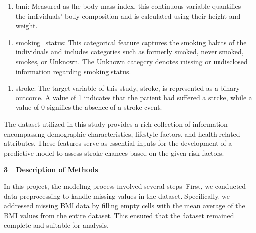 \documentclass[letterpaper]{article}
\newcounter{saveenum}
\newcommand\liststyleWWNumi{%
\renewcommand\theenumi{\arabic{enumi}}
\renewcommand\theenumii{\arabic{enumii}}
\renewcommand\theenumiii{\arabic{enumiii}}
\renewcommand\theenumiv{\arabic{enumiv}}
\renewcommand\labelenumi{\theenumi.}
\renewcommand\labelenumii{\theenumii.}
\renewcommand\labelenumiii{\theenumiii.}
\renewcommand\labelenumiv{\theenumiv.}
}
\begin{document}
\bigskip

\liststyleWWNumi
\setcounter{saveenum}{\value{enumi}}
\begin{enumerate}
\setcounter{enumi}{\value{saveenum}}
\item {
bmi: Measured as the body mass index, this continuous variable quantifies the individuals' body composition and is
calculated using their height and weight.}
\end{enumerate}

\bigskip

\liststyleWWNumi
\setcounter{saveenum}{\value{enumi}}
\begin{enumerate}
\setcounter{enumi}{\value{saveenum}}
\item {
smoking\_status: This categorical feature captures the smoking habits of the individuals and includes categories such as
{\textquotedbl}formerly smoked,{\textquotedbl} {\textquotedbl}never smoked,{\textquotedbl}
{\textquotedbl}smokes,{\textquotedbl} or {\textquotedbl}Unknown.{\textquotedbl} The
{\textquotedbl}Unknown{\textquotedbl} category denotes missing or undisclosed information regarding smoking status.}
\end{enumerate}

\bigskip

\liststyleWWNumi
\setcounter{saveenum}{\value{enumi}}
\begin{enumerate}
\setcounter{enumi}{\value{saveenum}}
\item {
stroke: The target variable of this study, stroke, is represented as a binary outcome. A value of 1 indicates that the
patient had suffered a stroke, while a value of 0 signifies the absence of a stroke event.}
\end{enumerate}
{
The dataset utilized in this study provides a rich collection of information encompassing demographic characteristics,
lifestyle factors, and health-related attributes. These features serve as essential inputs for the development of a
predictive model to assess stroke chances based on the given risk factors.}


\bigskip

{
\textbf{3\ \ Description of Methods}}

{
In this project, the modeling process involved several steps. First, we conducted data preprocessing to handle missing
values in the dataset. Specifically, we addressed missing BMI data by filling empty cells with the mean average of the
BMI values from the entire dataset. This ensured that the dataset remained complete and suitable for analysis.}
\end{document}
